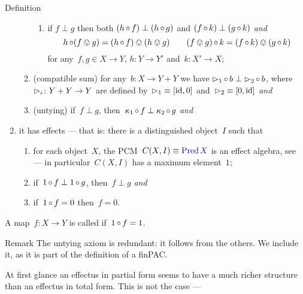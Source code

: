 \documentclass[b]{subfiles}
\begin{document}
\begin{parsec}
\begin{point}{Definition}
\begin{enumerate}
\begin{enumerate}
\begin{enumerate}
            \item
            if $f \perp g$ then both
                $(h \mathop{\circ} f) \perp (h \mathop{\circ} g)$ and
                $(f \mathop{\circ} k) \perp (g \mathop{\circ} k)$ \emph{and}
            \begin{equation*}
                 h \mathop{\circ} (f \ovee g) = 
                (h \mathop{\circ} f) \ovee (h \ovee g)\qquad
                (f \ovee g) \mathop{\circ} k = 
                (f \mathop{\circ} k) \ovee (g \mathop{\circ} k)
            \end{equation*}
                for any~$f,g \in X \to Y$,
                $h\colon Y \to Y'$
                and~$k \colon X'\to X$;
            \end{enumerate}
        \item
            (compatible sum)
            for any~$b\colon X \to Y + Y$ we have
            $\mathord{\vartriangleright}_1 \mathop{\circ} b \perp \mathord{\vartriangleright}_2 \mathop{\circ} b$,
            where~$\Define{\pproj_i}\colon Y + Y \to Y$
            are  defined
            by~$\mathord{\vartriangleright}_1 \equiv [\operatorname{id}, 0]$
            and~$\mathord{\vartriangleright}_2 \equiv [0, \operatorname{id}]$ \emph{and}
        \item
            (untying) if~$f\perp g$,
            then~$\kappa_1\mathop{\circ} f \perp \kappa_2 \mathop{\circ} g$ \emph{and}
    \end{enumerate}
    \item it has effects --- that is: there is a distinguished object~$I$
            such that
    \begin{enumerate}
        \item for each object~$X$, the PCM~$C(X,I) \equiv \Define{\Pred X}$
            is an effect algebra, see 
            --- in particular~$C(X,I)$
                has a maximum element~$1$;
        \item if~$1 \mathop{\circ} f \perp 1 \mathop{\circ} g$,
            then~$f \perp g$ \emph{and}
        \item if~$1 \mathop{\circ} f = 0$ then~$f = 0$.
    \end{enumerate}
\end{enumerate}
A map~$f\colon X \to Y$ is called  if~$1 \mathop{\circ} f = 1$.
\begin{point}{Remark}%
The untying axiom is redundant: it follows from the others.
We include it, as it is part
    of the definition of a finPAC.
\end{point}
\begin{point}%
At first glance an effectus in partial form seems
    to have a much richer structure than an effectus in total form.
This is not the case ---

\end{point}
\end{point}
\end{parsec}
\end{document}
